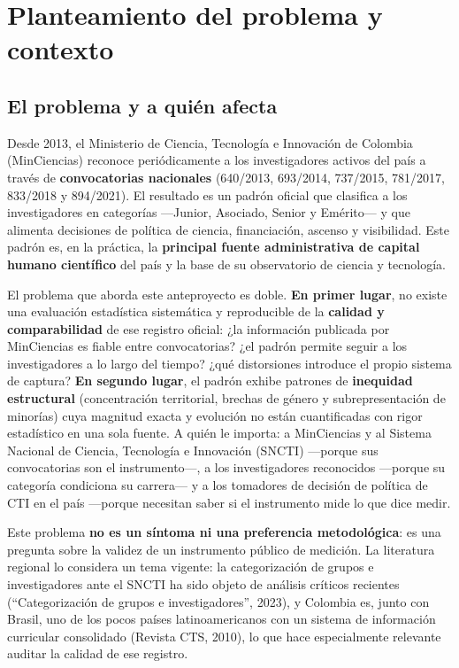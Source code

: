 \section{Planteamiento del problema y contexto}

\subsection{El problema y a quién afecta}

Desde 2013, el Ministerio de Ciencia, Tecnología e Innovación de Colombia
(MinCiencias) reconoce periódicamente a los investigadores activos del país a
través de \textbf{convocatorias nacionales} (640/2013, 693/2014, 737/2015,
781/2017, 833/2018 y 894/2021). El resultado es un padrón oficial que clasifica
a los investigadores en categorías —Junior, Asociado, Senior y Emérito— y que
alimenta decisiones de política de ciencia, financiación, ascenso y
visibilidad. Este padrón es, en la práctica, la \textbf{principal fuente
administrativa de capital humano científico} del país y la base de su
observatorio de ciencia y tecnología.

El problema que aborda este anteproyecto es doble. \textbf{En primer lugar},
no existe una evaluación estadística sistemática y reproducible de la
\textbf{calidad y comparabilidad} de ese registro oficial: ¿la información
publicada por MinCiencias es fiable entre convocatorias? ¿el padrón permite
seguir a los investigadores a lo largo del tiempo? ¿qué distorsiones introduce
el propio sistema de captura? \textbf{En segundo lugar}, el padrón exhibe
patrones de \textbf{inequidad estructural} (concentración territorial, brechas
de género y subrepresentación de minorías) cuya magnitud exacta y evolución no
están cuantificadas con rigor estadístico en una sola fuente. A quién le
importa: a MinCiencias y al Sistema Nacional de Ciencia, Tecnología e
Innovación (SNCTI) —porque sus convocatorias son el instrumento—, a los
investigadores reconocidos —porque su categoría condiciona su carrera— y a los
tomadores de decisión de política de CTI en el país —porque necesitan saber si
el instrumento mide lo que dice medir.

Este problema \textbf{no es un síntoma ni una preferencia metodológica}: es una
pregunta sobre la validez de un instrumento público de medición. La literatura
regional lo considera un tema vigente: la categorización de grupos e
investigadores ante el SNCTI ha sido objeto de análisis críticos recientes
(``Categorización de grupos e investigadores'', 2023), y Colombia es, junto con
Brasil,
uno de los pocos países latinoamericanos con un sistema de información
curricular consolidado (Revista CTS, 2010), lo que hace especialmente
relevante auditar la calidad de ese registro.

